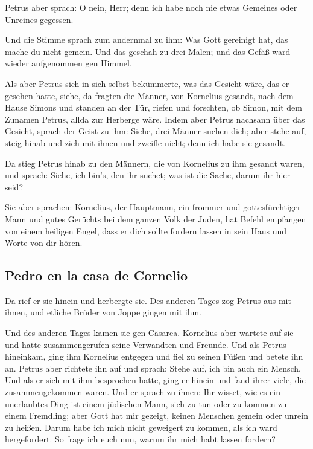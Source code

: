  Petrus aber sprach: O nein, Herr; denn ich habe noch nie
etwas Gemeines oder Unreines gegessen.

 Und die Stimme sprach zum andernmal zu ihm: Was Gott
gereinigt hat, das mache du nicht gemein.  Und das
geschah zu drei Malen; und das Gefäß ward wieder aufgenommen gen Himmel.

 Als aber Petrus sich in sich selbst bekümmerte, was das
Gesicht wäre, das er gesehen hatte, siehe, da fragten die Männer, von
Kornelius gesandt, nach dem Hause Simons und standen an der Tür,
 riefen und forschten, ob Simon, mit dem Zunamen Petrus,
allda zur Herberge wäre.  Indem aber Petrus nachsann über
das Gesicht, sprach der Geist zu ihm: Siehe, drei Männer suchen dich;
 aber stehe auf, steig hinab und zieh mit ihnen und
zweifle nicht; denn ich habe sie gesandt.

 Da stieg Petrus hinab zu den Männern, die von Kornelius
zu ihm gesandt waren, und sprach: Siehe, ich bin's, den ihr suchet; was
ist die Sache, darum ihr hier seid?

 Sie aber sprachen: Kornelius, der Hauptmann, ein frommer
und gottesfürchtiger Mann und gutes Gerüchts bei dem ganzen Volk der
Juden, hat Befehl empfangen von einem heiligen Engel, dass er dich
sollte fordern lassen in sein Haus und Worte von dir hören.

\hypertarget{pedro-en-la-casa-de-cornelio}{%
\subsection{Pedro en la casa de
Cornelio}\label{pedro-en-la-casa-de-cornelio}}

 Da rief er sie hinein und herbergte sie. Des anderen
Tages zog Petrus aus mit ihnen, und etliche Brüder von Joppe gingen mit
ihm.

 Und des anderen Tages kamen sie gen Cäsarea. Kornelius
aber wartete auf sie und hatte zusammengerufen seine Verwandten und
Freunde.  Und als Petrus hineinkam, ging ihm Kornelius
entgegen und fiel zu seinen Füßen und betete ihn an. 
Petrus aber richtete ihn auf und sprach: Stehe auf, ich bin auch ein
Mensch.  Und als er sich mit ihm besprochen hatte, ging
er hinein und fand ihrer viele, die zusammengekommen waren.
 Und er sprach zu ihnen: Ihr wisset, wie es ein
unerlaubtes Ding ist einem jüdischen Mann, sich zu tun oder zu kommen zu
einem Fremdling; aber Gott hat mir gezeigt, keinen Menschen gemein oder
unrein zu heißen.  Darum habe ich mich nicht geweigert zu
kommen, als ich ward hergefordert. So frage ich euch nun, warum ihr mich
habt lassen fordern?

